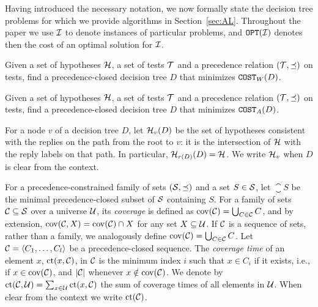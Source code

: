 Having introduced the necessary notation, we now formally state the decision tree problems for which we provide algorithms in Section~\ref{sec:AL}.
Throughout the paper we use $\mathcal{I}$ to denote instances of particular problems, and $\texttt{OPT}\mathopen{}\left( \mathcal{I} \right)$ denotes then the cost of an optimal solution for $\mathcal{I}$.
\begin{problem} \label{problem:PCWCDT}
Given a set of hypotheses $\mathcal{H}$, a set of tests $\mathcal{T}$ and a precedence relation $(\mathcal{T},\preceq)$ on tests, find a precedence-closed decision tree $D$ that minimizes $\texttt{COST}_W\mathopen{}\left( D \right)$.
\end{problem}
\begin{problem} \label{problem:PCACDT}
Given a set of hypotheses $\mathcal{H}$, a set of tests $\mathcal{T}$ and a precedence relation $(\mathcal{T},\preceq)$ on tests, find a precedence-closed decision tree $D$ that minimizes $\texttt{COST}_A\mathopen{}\left( D \right)$.
\end{problem}

For a node $v$ of a decision tree $D$, let $\mathcal{H}_v(D)$ be the set of hypotheses consistent with the replies on the path from the root to $v$: it is the intersection of $\mathcal{H}$ with the reply labels on that path. In particular, $\mathcal{H}_{r(D)}(D)=\mathcal{H}$. We write $\mathcal{H}_v$ when $D$ is clear from the context.

For a precedence-constrained family of sets $(\mathcal{S},\preceq)$ and a set $S\in\mathcal{S}$, let $\closure{S}$ be the minimal precedence-closed subset of $\mathcal{S}$ containing $S$.
For a family of sets $\mathcal{C}\subseteq \mathcal{S}$ over a universe $\mathcal{U}$, its \emph{coverage} is defined as $\operatorname{cov}\mathopen{}\left( \mathcal{C} \right)=\bigcup_{C\in\mathcal{C}}C$, and by extension, $\operatorname{cov}\mathopen{}\left( \mathcal{C}, X \right) = \operatorname{cov}\mathopen{}\left( \mathcal{C} \right) \cap X$ for any set $X\subseteq\mathcal{U}$.
If $\mathcal{C}$ is a sequence of sets, rather than a family, we analogously define $\operatorname{cov}\mathopen{}\left( \mathcal{C} \right)=\bigcup_{C\in\mathcal{C}}C$.
Let $\mathcal{C}=\mathopen{}\langle C_1,\ldots,C_l \rangle$ be a precedence-closed sequence.
The \emph{coverage time} of an element $x$, $\operatorname{ct}\mathopen{}\left( x,\mathcal{C} \right)$, in $\mathcal{C}$ is the minimum index $i$ such that $x\in C_i$ if it exists, i.e., if $x\in\operatorname{cov}\mathopen{}\left( \mathcal{C} \right)$, and $\mathopen{}\left| \mathcal{C} \right|$ whenever $x\notin \operatorname{cov}\mathopen{}\left( \mathcal{C} \right)$.
We denote by $\operatorname{ct}\mathopen{}\left( \mathcal{C}, \mathcal{U} \right)=\sum_{x\in\mathcal{U}}\operatorname{ct}\mathopen{}\left( x,\mathcal{C} \right)$ the sum of coverage times of all elements in $\mathcal{U}$.
When clear from the context we write $\operatorname{ct}\mathopen{}\left( \mathcal{C} \right)$.

